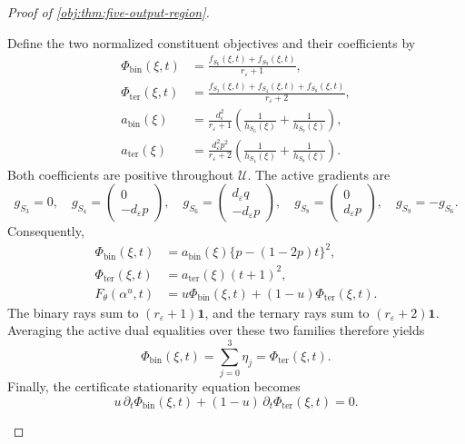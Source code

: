 \documentclass[11pt]{article}
\begin{document}
\begin{proof}[Proof of \cref{obj:thm:five-output-region}]
\begin{enumerate}
Define the two normalized constituent objectives and their coefficients by
\[
\begin{aligned}
\Phi_{\mathrm{bin}}(\xi,t)
&=\frac{f_{S_6}(\xi,t)+f_{S_9}(\xi,t)}{r_\varepsilon+1},\\
\Phi_{\mathrm{ter}}(\xi,t)
&=\frac{f_{S_3}(\xi,t)+f_{S_4}(\xi,t)+f_{S_8}(\xi,t)}
        {r_\varepsilon+2},\\
a_{\mathrm{bin}}(\xi)
&=\frac{d_\varepsilon^2}{r_\varepsilon+1}
  \left(\frac1{h_{S_6}(\xi)}+\frac1{h_{S_9}(\xi)}\right),\\
a_{\mathrm{ter}}(\xi)
&=\frac{d_\varepsilon^2p^2}{r_\varepsilon+2}
  \left(\frac1{h_{S_4}(\xi)}+\frac1{h_{S_8}(\xi)}\right).
\end{aligned}
\]
Both coefficients are positive throughout \(\mathcal U\).
The active gradients are
\[
g_{S_3}=0,\quad
g_{S_4}=\begin{pmatrix}0\\-d_\varepsilon p\end{pmatrix},\quad
g_{S_6}=\begin{pmatrix}d_\varepsilon q\\-d_\varepsilon p\end{pmatrix},\quad
g_{S_8}=\begin{pmatrix}0\\d_\varepsilon p\end{pmatrix},\quad
g_{S_9}=-g_{S_6}.
\]
Consequently,
\[
\begin{aligned}
\Phi_{\mathrm{bin}}(\xi,t)
&=a_{\mathrm{bin}}(\xi)\{p-(1-2p)t\}^2,\\
\Phi_{\mathrm{ter}}(\xi,t)
&=a_{\mathrm{ter}}(\xi)(t+1)^2,\\
F_\theta(\alpha^u,t)
&=u\Phi_{\mathrm{bin}}(\xi,t)+(1-u)\Phi_{\mathrm{ter}}(\xi,t).
\end{aligned}
\]
The binary rays sum to \((r_\varepsilon+1)\mathbf1\), and the ternary rays
sum to \((r_\varepsilon+2)\mathbf1\). Averaging the active dual equalities
over these two families therefore yields
\[
\Phi_{\mathrm{bin}}(\xi,t)
=
\sum_{j=0}^3\eta_j
=
\Phi_{\mathrm{ter}}(\xi,t).
\]
Finally, the certificate stationarity equation becomes
\[
u\,\partial_t\Phi_{\mathrm{bin}}(\xi,t)
+(1-u)\,\partial_t\Phi_{\mathrm{ter}}(\xi,t)=0.
\]


\end{enumerate}
\end{proof}
\end{document}
